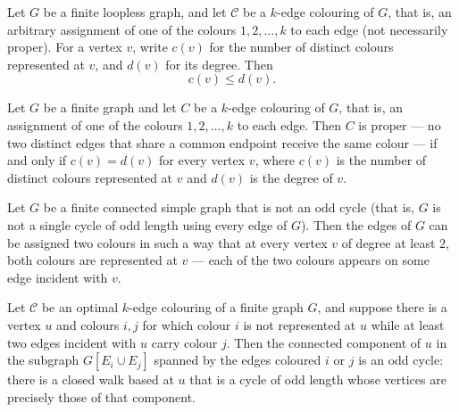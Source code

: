 \begin{theorem}
\label{SimpleGraph.numColoursAt_le_degree}
Let $G$ be a finite loopless graph, and let $\mathscr{C}$ be a $k$-edge colouring of
$G$, that is, an arbitrary assignment of one of the colours $1, 2, \ldots, k$ to each
edge (not necessarily proper). For a vertex $v$, write $c(v)$ for the number of distinct
colours represented at $v$, and $d(v)$ for its degree. Then \[c(v) \le d(v).\]
\end{theorem}

\begin{theorem}
\label{SimpleGraph.isProper_iff_numColoursAt_eq_degree}
Let $G$ be a finite graph and let $C$ be a $k$-edge colouring of $G$, that is, an
assignment of one of the colours $1, 2, \ldots, k$ to each edge. Then $C$ is proper — no
two distinct edges that share a common endpoint receive the same colour — if and only if
$c(v) = d(v)$ for every vertex $v$, where $c(v)$ is the number of distinct colours
represented at $v$ and $d(v)$ is the degree of $v$.
\end{theorem}

\begin{theorem}
\label{SimpleGraph.exists_two_edge_colouring_both_represented}
Let $G$ be a finite connected simple graph that is not an odd cycle (that is, $G$ is not
a single cycle of odd length using every edge of $G$). Then the edges of $G$ can be
assigned two colours in such a way that at every vertex $v$ of degree at least $2$, both
colours are represented at $v$ — each of the two colours appears on some edge incident
with $v$.
\end{theorem}

\begin{theorem}
\label{SimpleGraph.isOddCycle_component_of_isOptimalEdgeColouring}
Let $\mathscr{C}$ be an optimal $k$-edge colouring of a finite graph $G$, and suppose
there is a vertex $u$ and colours $i, j$ for which colour $i$ is not represented at $u$
while at least two edges incident with $u$ carry colour $j$. Then the connected
component of $u$ in the subgraph $G[E_i \cup E_j]$ spanned by the edges coloured $i$ or
$j$ is an odd cycle: there is a closed walk based at $u$ that is a cycle of odd length
whose vertices are precisely those of that component.
\end{theorem}

